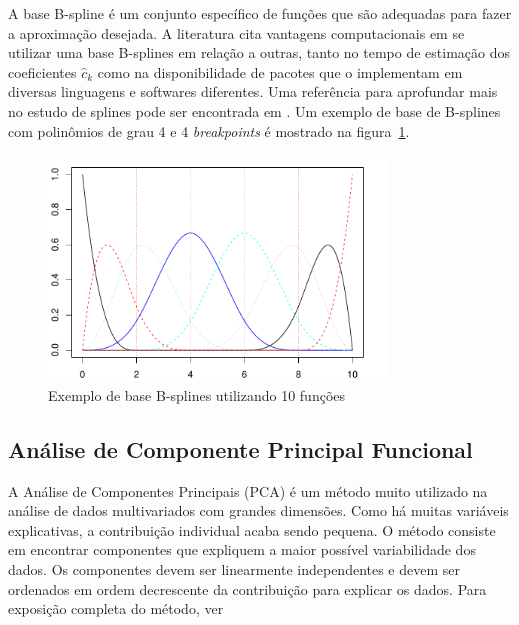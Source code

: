 \documentclass[
	12pt,				%
	openright,			%
	oneside,			%
	a4paper,			%
	english,			%
	brazil				%
	]{dissertacao-ufrgs-abntex2}
\begin{document}
A base B-spline é um conjunto específico de funções que são adequadas para fazer a aproximação desejada.
A literatura cita vantagens computacionais em se utilizar uma base B-splines em relação a outras, tanto no tempo de estimação dos coeficientes $\hat{c}_k$ como na disponibilidade de pacotes que o implementam em diversas linguagens e softwares diferentes.
Uma referência para aprofundar mais no estudo de splines pode ser encontrada em . Um exemplo de base de B-splines com polinômios de grau 4 e 4 \emph{breakpoints} é mostrado na figura~\ref{fig:base-bspline}.
\begin{figure}[h!] 
  \centering
    \includegraphics[width=0.8\textwidth]{anexos/base_bsplines1}
  \caption{Exemplo de base B-splines utilizando 10 funções}
  \label{fig:base-bspline}
\end{figure}

\subsection{Análise de Componente Principal Funcional}
\label{FPCA}

A Análise de Componentes Principais (PCA) é um método muito utilizado na análise de dados multivariados com grandes dimensões. Como há muitas variáveis explicativas, a contribuição individual acaba sendo pequena. O método consiste em encontrar componentes que expliquem a maior possível variabilidade dos dados. Os componentes devem ser linearmente independentes e devem ser ordenados em ordem decrescente da contribuição para explicar os dados. Para exposição completa do método, ver 
\end{document}
